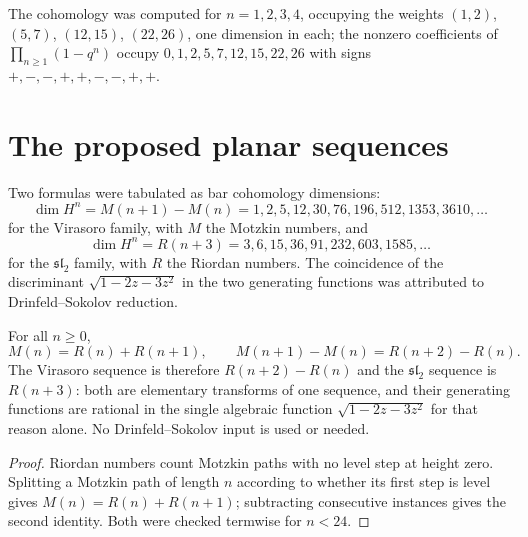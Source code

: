 The cohomology was computed for $n=1,2,3,4$, occupying the weights
$(1,2)$, $(5,7)$, $(12,15)$, $(22,26)$, one dimension in each; the nonzero
coefficients of $\prod_{n\ge1}(1-q^n)$ occupy $0,1,2,5,7,12,15,22,26$ with
signs $+,-,-,+,+,-,-,+,+$.

\section{The proposed planar sequences}

Two formulas were tabulated as bar cohomology dimensions:
\[
  \dim H^n = M(n+1)-M(n) = 1,2,5,12,30,76,196,512,1353,3610,\dots
\]
for the Virasoro family, with $M$ the Motzkin numbers, and
\[
  \dim H^n = R(n+3) = 3,6,15,36,91,232,603,1585,\dots
\]
for the $\mathfrak{sl}_2$ family, with $R$ the Riordan numbers. The
coincidence of the discriminant $\sqrt{1-2z-3z^2}$ in the two generating
functions was attributed to Drinfeld--Sokolov reduction.

\begin{proposition}
\label{prop:one-sequence}
\StatusComputed{} For all $n\ge0$,
\[
  M(n) = R(n)+R(n+1),
  \qquad
  M(n+1)-M(n) = R(n+2)-R(n).
\]
The Virasoro sequence is therefore $R(n+2)-R(n)$ and the
$\mathfrak{sl}_2$ sequence is $R(n+3)$: both are elementary transforms of
one sequence, and their generating functions are rational in the single
algebraic function $\sqrt{1-2z-3z^2}$ for that reason alone. No
Drinfeld--Sokolov input is used or needed.
\end{proposition}

\begin{proof}
Riordan numbers count Motzkin paths with no level step at height zero.
Splitting a Motzkin path of length $n$ according to whether its first step
is level gives $M(n)=R(n)+R(n+1)$; subtracting consecutive instances gives
the second identity. Both were checked termwise for $n<24$.
\end{proof}

